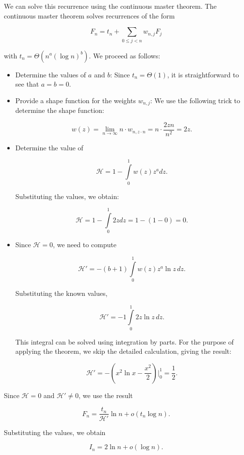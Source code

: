 We can solve this recurrence using the continuous master theorem. The continuous master theorem solves recurrences of the form

\[
F_n = t_n + \sum\limits_{0 \leq j < n} w_{n,j} F_j
\]

with \( t_n = \Theta(n^a (\log n)^b) \). We proceed as follows:

\begin{itemize}
    \item Determine the values of \( a \) and \( b \): Since \( t_n = \Theta(1) \), it is straightforward to see that \( a = b = 0 \).
    \item Provide a shape function for the weights \( w_{n,j} \): We use the following trick to determine the shape function:

    \[
    w(z) = \lim\limits_{n\to\infty} n \cdot w_{n,z\cdot n} = n \cdot \frac{2zn}{n^2} = 2z.
    \]

    \item Determine the value of 

    \[
    \mathcal{H} = 1 - \int\limits_{0}^{1} w(z) z^a dz.
    \]

    Substituting the values, we obtain:

    \[
    \mathcal{H} = 1 - \int\limits_{0}^{1} 2z dz = 1 - (1 - 0) = 0.
    \]

    \item Since \( \mathcal{H} = 0 \), we need to compute 

    \[
    \mathcal{H'} = -(b+1) \int\limits_{0}^{1} w(z) z^a \ln z \, dz.
    \]

    Substituting the known values,

    \[
    \mathcal{H'} = -1 \int\limits_{0}^{1} 2z \ln z \, dz.
    \]

    This integral can be solved using integration by parts. For the purpose of applying the theorem, we skip the detailed calculation, giving the result:

    \[
    \mathcal{H'} = - (x^2 \ln x - \frac{x^2}{2})\Big|_0^1 = \frac{1}{2}.
    \]

\end{itemize}

Since \( \mathcal{H} = 0 \) and \( \mathcal{H'} \neq 0 \), we use the result

\[
F_n = \frac{t_n}{\mathcal{H'}} \ln n + o(t_n \log n).
\]

Substituting the values, we obtain

\[
I_n = 2\ln n + o(\log n).
\]

